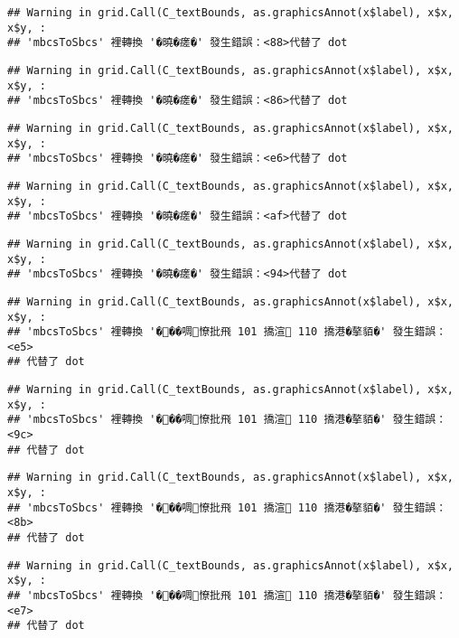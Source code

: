 \documentclass[
]{article}
\begin{document}
\begin{verbatim}
## Warning in grid.Call(C_textBounds, as.graphicsAnnot(x$label), x$x, x$y, :
## 'mbcsToSbcs' 裡轉換 '�曉�瘥�' 發生錯誤：<88>代替了 dot
\end{verbatim}

\begin{verbatim}
## Warning in grid.Call(C_textBounds, as.graphicsAnnot(x$label), x$x, x$y, :
## 'mbcsToSbcs' 裡轉換 '�曉�瘥�' 發生錯誤：<86>代替了 dot
\end{verbatim}

\begin{verbatim}
## Warning in grid.Call(C_textBounds, as.graphicsAnnot(x$label), x$x, x$y, :
## 'mbcsToSbcs' 裡轉換 '�曉�瘥�' 發生錯誤：<e6>代替了 dot
\end{verbatim}

\begin{verbatim}
## Warning in grid.Call(C_textBounds, as.graphicsAnnot(x$label), x$x, x$y, :
## 'mbcsToSbcs' 裡轉換 '�曉�瘥�' 發生錯誤：<af>代替了 dot
\end{verbatim}

\begin{verbatim}
## Warning in grid.Call(C_textBounds, as.graphicsAnnot(x$label), x$x, x$y, :
## 'mbcsToSbcs' 裡轉換 '�曉�瘥�' 發生錯誤：<94>代替了 dot
\end{verbatim}

\begin{verbatim}
## Warning in grid.Call(C_textBounds, as.graphicsAnnot(x$label), x$x, x$y, :
## 'mbcsToSbcs' 裡轉換 '���啁憭批飛 101 撟渲 110 撟港�摮貊�' 發生錯誤：<e5>
## 代替了 dot
\end{verbatim}

\begin{verbatim}
## Warning in grid.Call(C_textBounds, as.graphicsAnnot(x$label), x$x, x$y, :
## 'mbcsToSbcs' 裡轉換 '���啁憭批飛 101 撟渲 110 撟港�摮貊�' 發生錯誤：<9c>
## 代替了 dot
\end{verbatim}

\begin{verbatim}
## Warning in grid.Call(C_textBounds, as.graphicsAnnot(x$label), x$x, x$y, :
## 'mbcsToSbcs' 裡轉換 '���啁憭批飛 101 撟渲 110 撟港�摮貊�' 發生錯誤：<8b>
## 代替了 dot
\end{verbatim}

\begin{verbatim}
## Warning in grid.Call(C_textBounds, as.graphicsAnnot(x$label), x$x, x$y, :
## 'mbcsToSbcs' 裡轉換 '���啁憭批飛 101 撟渲 110 撟港�摮貊�' 發生錯誤：<e7>
## 代替了 dot
\end{verbatim}
\end{document}

